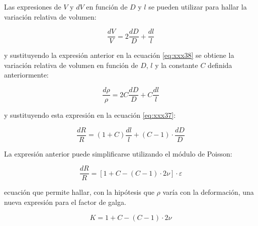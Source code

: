 Las expresiones de $V$ y $dV$ en función de $D$ y $l$ se pueden utilizar para hallar la variación 
relativa de volumen:

\begin{equation}
\frac{dV}{V} = 2 \frac{dD}{D} + \frac{dl}{l}
\end{equation}

y sustituyendo la expresión anterior en la ecuación \ref{eq:xxx38} se obtiene la variación 
relativa de volumen en función de $D$, $l$ y la constante $C$ definida anteriormente:

\begin{equation}
\frac{d\rho}{\rho} = 2C \frac{dD}{D} + C \frac{dl}{l}
\end{equation}

y sustituyendo esta expresión en la ecuación \ref{eq:xxx37}:

\begin{equation}
\frac{dR}{R} = (1+C) \frac{dl}{l} + (C-1)\cdot\frac{dD}{D}
\end{equation}

La expresión anterior puede simplificarse utilizando el módulo de Poisson:

\begin{equation}
\frac{dR}{R} = [1+C-(C-1)\cdot 2\nu]\cdot \varepsilon
\end{equation}

ecuación que permite hallar, con la hipótesis que $\rho$ varía con la deformación, una nueva 
expresión para el factor de galga.

\begin{equation}
K = 1 + C - (C-1) \cdot 2\nu
\end{equation}
